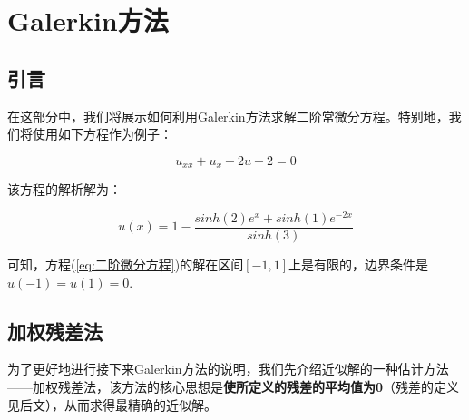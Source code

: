 \documentclass[12pt]{ctexart}
\numberwithin{equation}{section} %
\begin{document}
    
    
    
    
    

\section{Galerkin方法}
\subsection{引言}

在这部分中，我们将展示如何利用Galerkin方法求解二阶常微分方程。特别地，我们将使用如下方程作为例子：

\begin{equation}
    u_{xx}+u_x-2u+2=0
    \label{eq:二阶微分方程}
\end{equation}

该方程的解析解为：

\begin{equation}
    u(x)=1-\frac{sinh(2)e^x+sinh(1)e^{-2x}}{sinh(3)}
    \label{eq:解析解}
\end{equation}

可知，方程(\ref{eq:二阶微分方程})的解在区间$[-1,1]$上是有限的，边界条件是$u(-1)=u(1)=0$.


\subsection{加权残差法}
    为了更好地进行接下来Galerkin方法的说明，我们先介绍近似解的一种估计方法——加权残差法，该方法的核心思想是\textbf{使所定义的残差的平均值为0}（残差的定义见后文），从而求得最精确的近似解。
\end{document}
